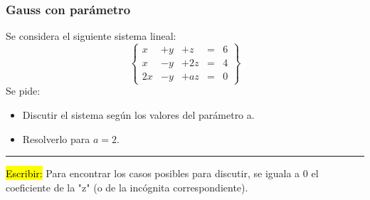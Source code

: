 \subsubsection{Gauss con parámetro}

Se considera el siguiente sistema lineal:
\[
\left\{\begin{array}{ccccc}
x&+y&+z&=&6\\
x&-y&+2z&=&4\\
2x&-y&+az&=&0
\end{array}\right\}
\]
Se pide:
\begin{itemize}
	\item Discutir el sistema según los valores del parámetro a.
	\item Resolverlo para $a=2$.
\end{itemize}


\hrule

\hl{Escribir:} Para encontrar los casos posibles para discutir, se iguala a 0 el coeficiente de la "z" (o de la incógnita correspondiente).

